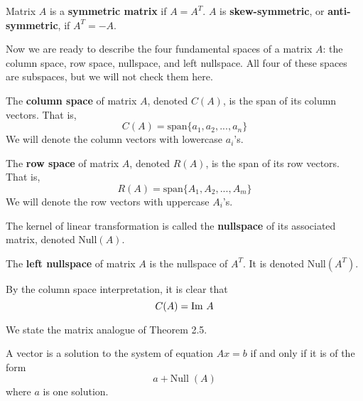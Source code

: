   \begin{definition}
    Matrix $A$ is a \textbf{symmetric matrix} if $A = A^T$. $A$ is \textbf{skew-symmetric}, or \textbf{anti-symmetric}, if $A^T = - A$. 
  \end{definition}

  Now we are ready to describe the four fundamental spaces of a matrix $A$: the column space, row space, nullspace, and left nullspace. All four of these spaces are subspaces, but we will not check them here. 

  \begin{definition}
    The \textbf{column space} of matrix $A$, denoted $C(A)$, is the span of its column vectors. That is, 
    \begin{equation}
      C(A) = \text{span}\{ a_1, a_2, ..., a_n\}
    \end{equation}
    We will denote the column vectors with lowercase $a_i$'s.
  \end{definition}

  \begin{definition}
    The \textbf{row space} of matrix $A$, denoted $R(A)$, is the span of its row vectors. That is, 
    \begin{equation}
      R(A) = \text{span}\{ A_1, A_2, ..., A_m\}
    \end{equation}
    We will denote the row vectors with uppercase $A_i$'s. 
  \end{definition}

  \begin{definition}
    The kernel of linear transformation is called the \textbf{nullspace} of its associated matrix, denoted Null$(A)$. 
  \end{definition}

  \begin{definition}
    The \textbf{left nullspace} of matrix $A$ is the nullspace of $A^T$. It is denoted Null$(A^T)$. 
  \end{definition}

  \begin{theorem}
    By the column space interpretation, it is clear that
    \begin{equation}
      C(A) = \im \, A
    \end{equation}
  \end{theorem}

  We state the matrix analogue of Theorem 2.5. 

  \begin{theorem}
    A vector is a solution to the system of equation $A x = b$ if and only if it is of the form 
    \begin{equation}
    a + \text{Null}\; (A)
    \end{equation}
    where $a$ is one solution. 
  \end{theorem}

